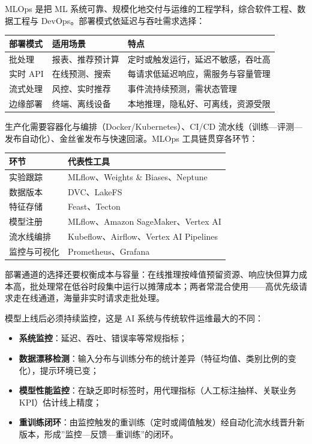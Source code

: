 \documentclass[12pt,a4paper,twoside,openany]{ctexbook}
\numberwithin{figure}{chapter}
\numberwithin{table}{chapter}
\providecommand{\tightlist}{\setlength{\itemsep}{0pt}\setlength{\parskip}{0pt}}
\newcounter{none}
\begin{document}
MLOps 是把 ML
系统可靠、规模化地交付与运维的工程学科，综合软件工程、数据工程与
DevOps。部署模式依延迟与吞吐需求选择：

{\def\LTcaptype{none} %
\begin{longtable}[]{@{}lll@{}}
\toprule\noalign{}
部署模式 & 适用场景 & 特点 \\
\midrule\noalign{}
\endhead
\bottomrule\noalign{}
\endlastfoot
批处理 & 报表、推荐预计算 & 定时或触发运行，延迟不敏感，吞吐高 \\
实时 API & 在线预测、搜索 & 每请求低延迟响应，需服务与容量管理 \\
流式处理 & 风控、实时推荐 & 事件流持续预测，需状态管理 \\
边缘部署 & 终端、离线设备 & 本地推理，隐私好、可离线，资源受限 \\
\end{longtable}
}

生产化需要容器化与编排（Docker/Kubernetes）、CI/CD
流水线（训练---评测---发布自动化）、金丝雀发布与快速回滚。MLOps
工具链贯穿各环节：

{\def\LTcaptype{none} %
\begin{longtable}[]{@{}ll@{}}
\toprule\noalign{}
环节 & 代表性工具 \\
\midrule\noalign{}
\endhead
\bottomrule\noalign{}
\endlastfoot
实验跟踪 & MLflow、Weights \& Biases、Neptune \\
数据版本 & DVC、LakeFS \\
特征存储 & Feast、Tecton \\
模型注册 & MLflow、Amazon SageMaker、Vertex AI \\
流水线编排 & Kubeflow、Airflow、Vertex AI Pipelines \\
监控与可视化 & Prometheus、Grafana \\
\end{longtable}
}

部署通道的选择还要权衡成本与容量：在线推理按峰值预留资源、响应快但算力成本高，批处理常在低谷时段集中运行以摊薄成本；两者常混合使用------高优先级请求走在线通道，海量非实时请求走批处理。

模型上线后必须持续监控，这是 AI 系统与传统软件运维最大的不同：

\begin{itemize}
\tightlist
\item
  \textbf{系统监控}：延迟、吞吐、错误率等常规指标；
\item
  \textbf{数据漂移检测}：输入分布与训练分布的统计差异（特征均值、类别比例的变化），提示环境已变；
\item
  \textbf{模型性能监控}：在缺乏即时标签时，用代理指标（人工标注抽样、关联业务
  KPI）估计线上精度；
\item
  \textbf{重训练闭环}：由监控触发的重训练（定时或阈值触发）经自动化流水线晋升新版本，形成''监控---反馈---重训练''的闭环。
\end{itemize}
\end{document}
